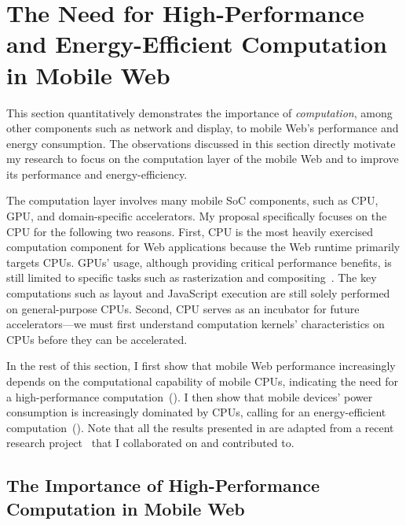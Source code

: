 
\chapter{The Need for High-Performance and Energy-Efficient Computation in Mobile Web}
\label{sec:motivation}

This section quantitatively demonstrates the importance of \textit{computation}, among other components such as network and display, to mobile Web's performance and energy consumption. The observations discussed in this section directly motivate my research to focus on the computation layer of the mobile Web and to improve its performance and energy-efficiency.

The computation layer involves many mobile SoC components, such as CPU, GPU, and domain-specific accelerators. My proposal specifically focuses on the CPU for the following two reasons. First, CPU is the most heavily exercised computation component for Web applications because the Web runtime primarily targets CPUs. GPUs' usage, although providing critical performance benefits, is still limited to specific tasks such as rasterization and compositing~\cite{gpucompositor}. The key computations such as layout and JavaScript execution are still solely performed on general-purpose CPUs. Second, CPU serves as an incubator for future accelerators---we must first understand computation kernels' characteristics on CPUs before they can be accelerated.

In the rest of this section, I first show that mobile Web performance increasingly depends on the computational capability of mobile CPUs, indicating the need for a high-performance computation~(). I then show that mobile devices' power consumption is increasingly dominated by CPUs, calling for an energy-efficient computation~(). Note that all the results presented in  are adapted from a recent research project~\cite{mobilecpu} that I collaborated on and contributed to.

\section{The Importance of High-Performance Computation in Mobile Web}
\label{sec:motivation:perf}

